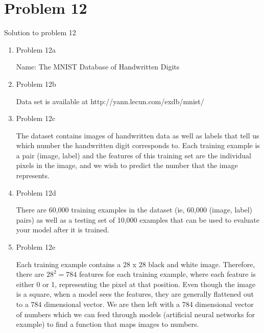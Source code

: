 \documentclass[11pt]{article}
\newcommand{\solution}[1]{{{\color{blue}{\bf Solution:} {#1}}}}
\begin{document}
\newpage

\section{Problem 12}

\solution{Solution to problem 12}
\begin{enumerate}
\item Problem 12a

\solution{
Name: The MNIST Database of Handwritten Digits
}

\vspace{0.5cm}
\item Problem 12b

\solution{
Data set is available at http://yann.lecun.com/exdb/mnist/
}

\vspace{0.5cm}
\item Problem 12c

\solution{
The dataset contains images of handwritten data as well as labels that tell us which number the handwritten digit corresponds to. Each training example is a pair (image, label) and the features of this training set are the individual pixels in the image, and we wish to predict the number that the image represents.
}

\vspace{0.5cm}
\item Problem 12d

\solution{
There are 60,000 training examples in the dataset (ie, 60,000 (image, label) pairs) as well as a testing set of 10,000 examples that can be used to evaluate your model after it is trained. 
}

\vspace{0.5cm}
\item Problem 12e

\solution{
Each training example contains a 28 x 28 black and white image. Therefore, there are $ 28^2 = 784$ features for each training example, where each feature is either 0 or 1, representing the pixel at that position. Even though the image is a square, when a model sees the features, they are generally flattened out to a 784 dimensional vector. We are then left with a 784 dimensional vector of numbers which we can feed through models (artificial neural networks for example) to find a function that maps images to numbers. 
}





\end{enumerate}
\end{document}
